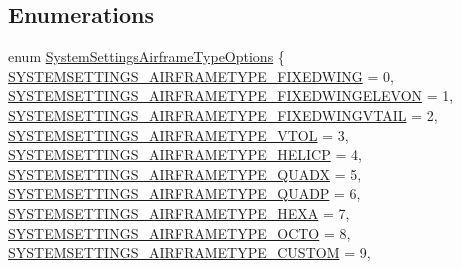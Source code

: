 \subsection*{\-Enumerations}
\begin{DoxyCompactItemize}
\item 
enum \hyperlink{group___system_settings_gaa057b963d0a405dc7e785305135c4e07}{\-System\-Settings\-Airframe\-Type\-Options} \{ \*
\hyperlink{group___system_settings_ggaa057b963d0a405dc7e785305135c4e07a631ff0011ffc2a8f3a0d52b6695b6cf4}{\-S\-Y\-S\-T\-E\-M\-S\-E\-T\-T\-I\-N\-G\-S\-\_\-\-A\-I\-R\-F\-R\-A\-M\-E\-T\-Y\-P\-E\-\_\-\-F\-I\-X\-E\-D\-W\-I\-N\-G} = 0, 
\hyperlink{group___system_settings_ggaa057b963d0a405dc7e785305135c4e07a09dabf0ff94609dc72becfa833ce2b05}{\-S\-Y\-S\-T\-E\-M\-S\-E\-T\-T\-I\-N\-G\-S\-\_\-\-A\-I\-R\-F\-R\-A\-M\-E\-T\-Y\-P\-E\-\_\-\-F\-I\-X\-E\-D\-W\-I\-N\-G\-E\-L\-E\-V\-O\-N} = 1, 
\hyperlink{group___system_settings_ggaa057b963d0a405dc7e785305135c4e07ae6d08783bb96faa3bc8f4d2c6f2148c3}{\-S\-Y\-S\-T\-E\-M\-S\-E\-T\-T\-I\-N\-G\-S\-\_\-\-A\-I\-R\-F\-R\-A\-M\-E\-T\-Y\-P\-E\-\_\-\-F\-I\-X\-E\-D\-W\-I\-N\-G\-V\-T\-A\-I\-L} = 2, 
\hyperlink{group___system_settings_ggaa057b963d0a405dc7e785305135c4e07afece0a3c365adfc9457cea3423b6bb70}{\-S\-Y\-S\-T\-E\-M\-S\-E\-T\-T\-I\-N\-G\-S\-\_\-\-A\-I\-R\-F\-R\-A\-M\-E\-T\-Y\-P\-E\-\_\-\-V\-T\-O\-L} = 3, 
\*
\hyperlink{group___system_settings_ggaa057b963d0a405dc7e785305135c4e07acbbb5f408201e321994c3b6d1ce62c24}{\-S\-Y\-S\-T\-E\-M\-S\-E\-T\-T\-I\-N\-G\-S\-\_\-\-A\-I\-R\-F\-R\-A\-M\-E\-T\-Y\-P\-E\-\_\-\-H\-E\-L\-I\-C\-P} = 4, 
\hyperlink{group___system_settings_ggaa057b963d0a405dc7e785305135c4e07a3bffdc9c44f5a21c1a58f02d6f059948}{\-S\-Y\-S\-T\-E\-M\-S\-E\-T\-T\-I\-N\-G\-S\-\_\-\-A\-I\-R\-F\-R\-A\-M\-E\-T\-Y\-P\-E\-\_\-\-Q\-U\-A\-D\-X} = 5, 
\hyperlink{group___system_settings_ggaa057b963d0a405dc7e785305135c4e07ac42a93287610d7677eae57a10fb1b06a}{\-S\-Y\-S\-T\-E\-M\-S\-E\-T\-T\-I\-N\-G\-S\-\_\-\-A\-I\-R\-F\-R\-A\-M\-E\-T\-Y\-P\-E\-\_\-\-Q\-U\-A\-D\-P} = 6, 
\hyperlink{group___system_settings_ggaa057b963d0a405dc7e785305135c4e07a7842658dcef9e6a72b75808b05ed37b1}{\-S\-Y\-S\-T\-E\-M\-S\-E\-T\-T\-I\-N\-G\-S\-\_\-\-A\-I\-R\-F\-R\-A\-M\-E\-T\-Y\-P\-E\-\_\-\-H\-E\-X\-A} = 7, 
\*
\hyperlink{group___system_settings_ggaa057b963d0a405dc7e785305135c4e07a3ae118b178937a6297f11684fb8a7732}{\-S\-Y\-S\-T\-E\-M\-S\-E\-T\-T\-I\-N\-G\-S\-\_\-\-A\-I\-R\-F\-R\-A\-M\-E\-T\-Y\-P\-E\-\_\-\-O\-C\-T\-O} = 8, 
\hyperlink{group___system_settings_ggaa057b963d0a405dc7e785305135c4e07ad673730dd5d9ff2550b01791ec46eb5c}{\-S\-Y\-S\-T\-E\-M\-S\-E\-T\-T\-I\-N\-G\-S\-\_\-\-A\-I\-R\-F\-R\-A\-M\-E\-T\-Y\-P\-E\-\_\-\-C\-U\-S\-T\-O\-M} = 9, 

\end{DoxyCompactItemize}
